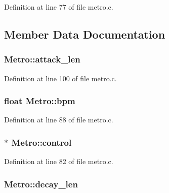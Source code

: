 Definition at line 77 of file metro.\+c.



\subsection{Member Data Documentation}
\subsubsection[{\texorpdfstring{attack\+\_\+len}{attack_len}}]{ Metro\+::attack\+\_\+len}\hypertarget{struct_metro_a08b7dc8a36da651e3b9997f3042922bd}{}\label{struct_metro_a08b7dc8a36da651e3b9997f3042922bd}


Definition at line 100 of file metro.\+c.

\subsubsection[{\texorpdfstring{bpm}{bpm}}]{\setlength{\rightskip}{0pt plus 5cm}float Metro\+::bpm}\hypertarget{struct_metro_a67f939426c3147f0a45f92b72f11335a}{}\label{struct_metro_a67f939426c3147f0a45f92b72f11335a}


Definition at line 88 of file metro.\+c.

\subsubsection[{\texorpdfstring{control}{control}}]{$\ast$ Metro\+::control}\hypertarget{struct_metro_ab81ffab3af21d9bc735c99a362ae3766}{}\label{struct_metro_ab81ffab3af21d9bc735c99a362ae3766}


Definition at line 82 of file metro.\+c.

\subsubsection[{\texorpdfstring{decay\+\_\+len}{decay_len}}]{ Metro\+::decay\+\_\+len}\hypertarget{struct_metro_a728fc0ac8d1460597a2291fde05175fb}{}\label{struct_metro_a728fc0ac8d1460597a2291fde05175fb}


